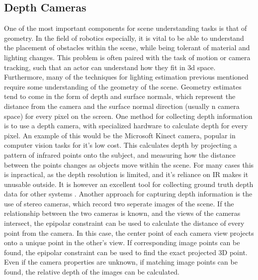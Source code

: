 \documentclass[ %
                    author={Gavin Parker},
                supervisor={Dr. Neill Campbell},
                    degree={MEng},
                     title={Deep Siamese Networks for Illumination Estimation from Stereo Images},
                  subtitle={},
                      type={research},
                      year={2018} ]{dissertation}
\begin{document}
\subsection{Depth Cameras}
One of the most important components for scene understanding tasks is that of geometry. In the field of robotics especially, it is vital to be able to understand the placement of obstacles within the scene, while being tolerant of material and lighting changes. This problem is often paired with the task of motion or camera tracking, such that an actor can understand how they fit in 3d space. Furthermore, many of the techniques for lighting estimation previous mentioned require some understanding of the geometry of the scene. Geometry estimates tend to come in the form of depth and surface normals, which represent the distance from the camera and the surface normal direction (usually n camera space) for every pixel on the screen.
\newline
One method for collecting depth information is to use a depth camera, with specialized hardware to calculate depth for every pixel. An example of this would be the Microsoft Kinect camera, popular in computer vision tasks for it's low cost. This calculates depth by projecting a pattern of infrared points onto the subject, and measuring how the distance between the points changes as objects move within the scene. For many cases this is inpractical, as the depth resolution is limited, and it's reliance on IR makes it unusable outside. It is however an excellent tool for collecting ground truth depth data for other systems \cite{Khoshelham_accuracyand}.
\newline
Another approach for capturing depth information is the use of stereo cameras, which record two seperate images of the scene. If the relationship between the two cameras is known, and the views of the cameras intersect, the epipolar constraint can be used to calculate the distance of every point from the camera. In this case, the center point of each camera view projects onto a unique point in the other's view. If corresponding image points can be found, the epipolar constraint can be used to find the exact projected 3D point. Even if the camera properties are unknown, if matching image points can be found, the relative depth of the images can be calculated.
\end{document}
